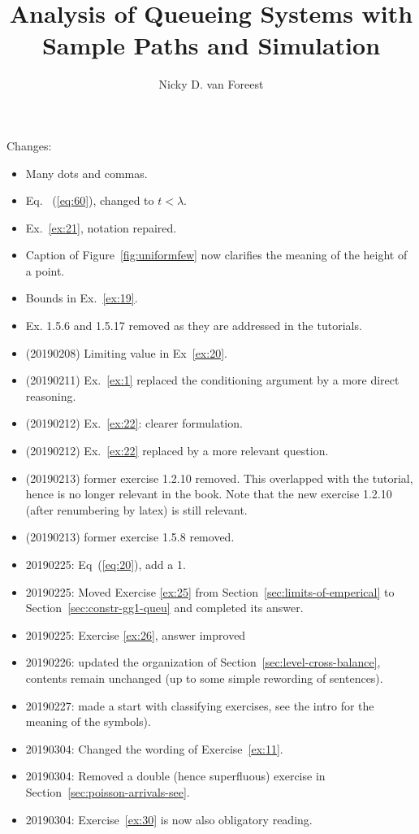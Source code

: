 \author{Nicky D. van  Foreest}
\title{Analysis of Queueing Systems with  Sample Paths and Simulation }


\maketitle

Changes:
\begin{itemize}
\item Many dots and commas. 
\item Eq. ~(\ref{eq:60}), changed to $t<\lambda$. 
\item Ex.~\ref{ex:21}, notation repaired.
\item Caption of Figure~\ref{fig:uniformfew} now clarifies the meaning of the height of a point. 
\item Bounds in Ex.~\ref{ex:19}.
\item Ex. 1.5.6 and 1.5.17 removed as they are  addressed in the tutorials. 
\item (20190208) Limiting value in Ex~\ref{ex:20}. 
\item (20190211) Ex.~\ref{ex:1} replaced the conditioning argument by a more direct reasoning.
\item (20190212) Ex.~\ref{ex:22}: clearer formulation.
\item (20190212) Ex.~\ref{ex:22} replaced by a more relevant question.
\item (20190213) former exercise 1.2.10 removed. This overlapped with the tutorial, hence is no longer relevant in the book. Note that the new exercise 1.2.10 (after renumbering by latex) is still relevant. 
\item (20190213) former exercise 1.5.8 removed.
\item 20190225: Eq~(\ref{eq:20}), add a 1.
\item 20190225: Moved Exercise \ref{ex:25} from Section~\ref{sec:limits-of-emperical} to Section~\ref{sec:constr-gg1-queu} and completed its answer.
\item 20190225:  Exercise \ref{ex:26}, answer improved
\item 20190226:  updated the organization of Section~\ref{sec:level-cross-balance}, contents remain unchanged (up to some simple rewording of sentences).
\item 20190227:  made a start with classifying exercises, see the intro for the meaning of the symbols).
\item 20190304: Changed the wording of Exercise~\ref{ex:11}. 
\item 20190304: Removed a double (hence superfluous) exercise in Section~\ref{sec:poisson-arrivals-see}. 
\item 20190304: Exercise~\ref{ex:30} is now also obligatory reading.
\end{itemize}

